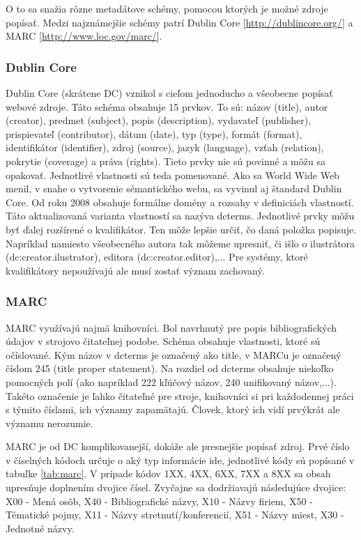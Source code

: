 \documentclass[thesis=M,slovak]{FITthesis}[2013/05/06]
\begin{document}
O to sa snažia rôzne metadátove schémy, pomocou ktorých je možné zdroje popísať. Medzi najznámejšie schémy patrí Dublin Core [\url{http://dublincore.org/}] a MARC [\url{http://www.loc.gov/marc/}].

\subsubsection{Dublin Core}
Dublin Core (skrátene DC) vznikol s cieľom jednoducho a všeobecne popísať webové zdroje. Táto schéma obsahuje 15  prvkov. To sú: názov (title), autor (creator), predmet (subject), popis (description), vydavateľ (publisher), prispievateľ (contributor), dátum (date), typ (type), formát (format), identifikátor (identifier), zdroj (source), jazyk (language), vzťah (relation), pokrytie (coverage) a práva (rights). Tieto prvky nie sú povinné a môžu sa opakovať. Jednotlivé vlastnosti sú teda pomenované. Ako sa World Wide Web menil, v snahe o vytvorenie sémantického webu, sa vyvinul aj štandard Dublin Core. Od roku 2008 obsahuje formálne domény a rozsahy v definiciách vlastností. Táto aktualizovaná varianta vlastností sa nazýva dcterms. Jednotlivé prvky môžu byť ďalej rozšírené o kvalifikátor. Ten môže lepšie určiť, čo daná položka popisuje. Napríklad namiesto všeobecného autora tak môžeme upresniť, či išlo o ilustrátora (dc:creator.ilustrator), editora (dc:creator.editor),...  Pre systémy, ktoré kvalifikátory nepoužívajú ale musí zostať význam zachovaný.

\subsubsection{MARC}
MARC využívajú najmä knihovníci. Bol navrhnutý pre popis bibliografických údajov v strojovo čitateľnej podobe.
Schéma obsahuje vlastnosti, ktoré sú očíslované. Kým názov v dcterms je označený ako title, v MARCu  je označený číslom 245 (title proper statement). Na rozdiel od dcterms obsahuje niekoľko pomocných polí (ako napríklad 222 kľúčový názov, 240 unifikovaný názov,...). Takéto označenie je ľahko čitateľné pre stroje, knihovníci si pri každodennej práci s týmito číslami, ich významy zapamätajú. Človek, ktorý ich vidí prvýkrát ale významu nerozumie.

MARC je od DC komplikovanejší, dokáže ale presnejšie popísať zdroj.
Prvé číslo v číselných kódoch určuje o aký typ informácie ide, jednotlivé kódy sú popísané v tabuľke \ref{tab:marc}. V prípade kódov 1XX, 4XX, 6XX, 7XX a 8XX sa obsah upresňuje doplnením dvojice čísel. Zvyčajne sa dodržiavajú následujúce dvojice: X00 - Mená osôb, X40 - Bibliografické názvy, X10 - Názvy firiem, X50 - Tématické pojmy, X11 - Názvy stretnutí/konferencií, X51 - Názvy miest, X30 - Jednotné názvy.
\end{document}
